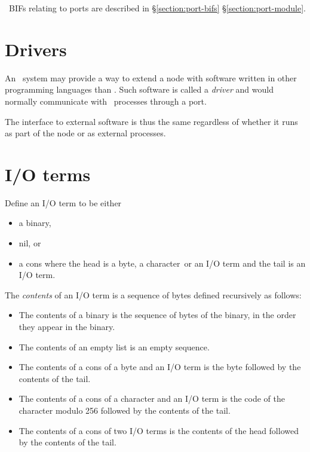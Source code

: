 \Erlang\ BIFs relating to ports are described in
\ifOld\S\ref{section:port-bifs}\fi
\ifStd\S\ref{section:port-module}\fi.

\section{Drivers}

\label{section:drivers}

An \Erlang\ system may provide a way to extend a node with software written in other
programming languages than \Erlang.  Such software is called a \emph{driver} and would
normally communicate with \Erlang\ processes through a port.

The interface to external software is thus the same regardless of whether it runs as
part of the node or as external processes.

\section{I/O terms}

\label{section:io-term}

Define an I/O term to be either
\begin{itemize}
\item a binary,
\item nil, or
\item a cons where the head is a byte\ifStd, a character\fi\ or an I/O term
and the tail is an I/O term.
\end{itemize}

The \emph{contents} of an I/O term is a sequence of bytes defined
recursively as follows:
\begin{itemize}
\item The contents of a binary is the sequence of bytes of the binary,
in the order they appear in the binary.
\item The contents of an empty list is an empty sequence.
\item The contents of a cons of a byte and an I/O term is
the byte followed by the contents of the tail.
\ifStd
\item The contents of a cons of a character and an I/O term is
the code of the character modulo 256 followed by the contents of the tail.
\fi
\item The contents of a cons of two I/O terms is
the contents of the head followed by the contents of the tail.
\end{itemize}

